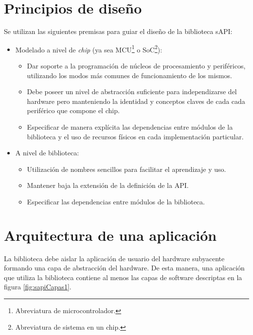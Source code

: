 \section{Principios de diseño}
\label{sec:principiosDiseno}

Se utilizan las siguientes premisas para guiar el diseño de la biblioteca sAPI:

\begin{itemize}
\item
Modelado a nivel de \emph{chip} (ya sea MCU\footnote{Abreviatura de microcontrolador.} o SoC\footnote{Abreviatura de sistema en un chip.}):
\begin{itemize}
\item
Dar soporte a la programación de núcleos de procesamiento y periféricos, utilizando los modos más comunes de funcionamiento de los mismos.
\item
Debe poseer un nivel de abstracción suficiente para independizarse del hardware pero manteniendo la identidad y conceptos claves de cada cada periférico que compone el chip.
\item
Especificar de manera explícita las dependencias entre módulos de la biblioteca y el uso de recursos físicos en cada implementación particular.
\end{itemize}
\item
A nivel de biblioteca:
\begin{itemize}
\item
Utilización de nombres sencillos para facilitar el aprendizaje y uso.
\item
Mantener baja la extensión de la definición de la API.
\item
Especificar las dependencias entre módulos de la biblioteca.
\end{itemize}
\end{itemize}

\section{Arquitectura de una aplicación}
\label{sec:arqApp}

La biblioteca debe aislar la aplicación de usuario del hardware subyacente formando una capa de abstracción del hardware. De esta manera, una aplicación que utiliza la biblioteca contiene al menos las capas de software descriptas en la figura \ref{fig:sapiCapas1}.

